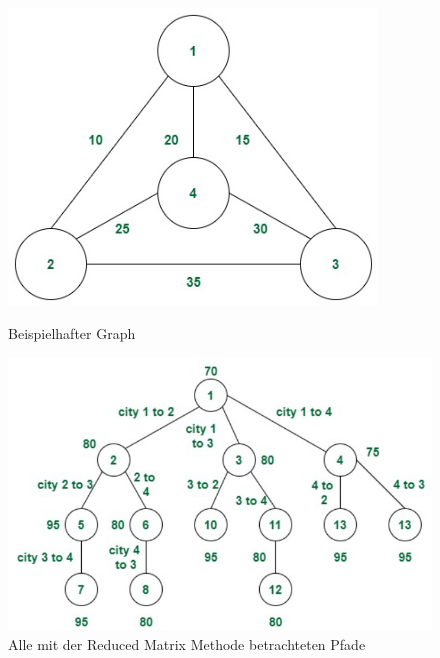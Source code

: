 \begin{figure}[H]
\centering
\begin{minipage}{.4\textwidth}
  \centering

    \includegraphics[width=\textwidth]{images/reducedMatrixGraph.png}
    \caption{Beispielhafter Graph}
    \label{fig:reducedMatrixGraph}

\end{minipage}%
\begin{minipage}{.6\textwidth}
  \centering
    \includegraphics[width=\textwidth]{images/reducedMatrixTree.png}
    \caption{Alle mit der Reduced Matrix Methode betrachteten Pfade}
    \label{fig:reducedMatrixTree}
\end{minipage}
\end{figure}


